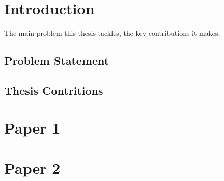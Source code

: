 \chapter{Introduction}

The main problem this thesis tackles, the key contributions it makes, \etc{}

\cite{latex}
\section{Problem Statement}
\section{Thesis Contritions}

\chapter{Paper 1}

\chapter{Paper 2}

